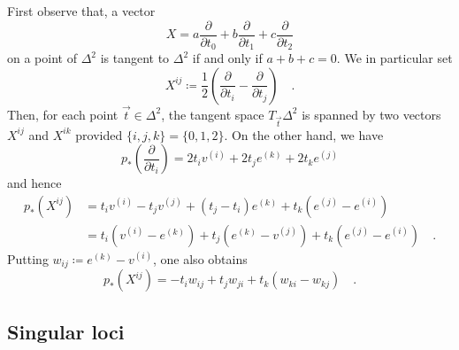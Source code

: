 \documentclass[pdftex,a4paper,12pt]{scrartcl}
\theoremstyle{plain}
\theoremstyle{definition}
\theoremstyle{remark}
\begin{document}
First observe that, a vector
\[
X=a\frac\partial{\partial t_0}+b\frac\partial{\partial t_1}+c\frac\partial{\partial t_2}
\]
on a point of $\Delta^2$ is tangent to $\Delta^2$ if and only if $a+b+c=0$.
We in particular set
\[
X^{ij}\coloneqq  \frac12\left(\frac\partial{\partial t_i}-\frac\partial{\partial t_j}\right)
\quad.
\]
Then, for each point $\vec t\in\Delta^2$, the tangent space $T_{\vec t}\Delta^2$ is spanned by two vectors $X^{ij}$ and $X^{ik}$ provided $\{i,j,k\}=\{0,1,2\}$.
On the other hand, we have
\[
p_\ast\left(\frac\partial{\partial t_i}\right)
= 2t_iv^{(i)}+2t_je^{(k)}+2t_ke^{(j)}
\]
and hence
\begin{equation}
\label{eq:dpX}
\begin{split}
p_\ast(X^{ij})
&= t_iv^{(i)}-t_jv^{(j)}+(t_j-t_i)e^{(k)}+t_k(e^{(j)}-e^{(i)}) \\
&= t_i(v^{(i)}-e^{(k)})+t_j(e^{(k)}-v^{(j)})+t_k(e^{(j)}-e^{(i)})
\quad.
\end{split}
\end{equation}
Putting $w_{ij}\coloneqq e^{(k)}-v^{(i)}$, one also obtains
\begin{equation}
\label{eq:dpX-inw}
p_\ast(X^{ij})
= -t_iw_{ij}+t_jw_{ji}+t_k(w_{ki}-w_{kj})
\quad.
\end{equation}

\subsection{Singular loci}
\end{document}
